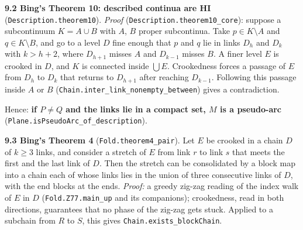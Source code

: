 \documentclass[11pt]{article}
\newcommand{\lean}[1]{\texttt{#1}}
\begin{document}
\textbf{9.2 Bing's Theorem 10: described continua are HI} (\lean{Description.\hspace{0pt}theorem10}). \emph{Proof} (\lean{Description.\hspace{0pt}theorem10\_\hspace{0pt}core}): suppose a subcontinuum $K = A \cup B$ with $A$, $B$ proper subcontinua. Take $p \in K \setminus A$ and $q \in K \setminus B$, and go to a level $D$ fine enough that $p$ and $q$ lie in links $D_h$ and $D_k$ with $k > h + 2$, where $D_{h+1}$ misses $A$ and $D_{k-1}$ misses $B$. A finer level $E$ is crooked in $D$, and $K$ is connected inside $\bigcup E$. Crookedness forces a passage of $E$ from $D_h$ to $D_k$ that returns to $D_{h+1}$ after reaching $D_{k-1}$. Following this passage inside $A$ or $B$ (\lean{Chain.\hspace{0pt}inter\_\hspace{0pt}link\_\hspace{0pt}nonempty\_\hspace{0pt}between}) gives a contradiction.

Hence: \textbf{if $P \neq Q$ and the links lie in a compact set, $M$ is a pseudo-arc} (\lean{Plane.\hspace{0pt}isPseudoArc\_\hspace{0pt}of\_\hspace{0pt}description}).

\textbf{9.3 Bing's Theorem 4} (\lean{Fold.\hspace{0pt}theorem4\_\hspace{0pt}pair}). Let $E$ be crooked in a chain $D$ of $k \geq 3$ links, and consider a stretch of $E$ from link $r$ to link $s$ that meets the first and the last link of $D$. Then the stretch can be consolidated by a block map into a chain each of whose links lies in the union of three consecutive links of $D$, with the end blocks at the ends. \emph{Proof:} a greedy zig-zag reading of the index walk of $E$ in $D$ (\lean{Fold.\hspace{0pt}Z77.\hspace{0pt}main\_\hspace{0pt}up} and its companions); crookedness, read in both directions, guarantees that no phase of the zig-zag gets stuck. Applied to a subchain from $R$ to $S$, this gives \lean{Chain.\hspace{0pt}exists\_\hspace{0pt}blockChain}.
\end{document}

